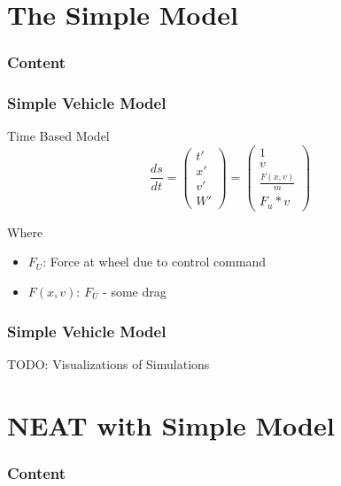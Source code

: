 \documentclass[8pt]{beamer}
\begin{document}
\section{The Simple Model}
\begin{frame}
	\frametitle{Content}
\end{frame}
\begin{frame}
	\frametitle{Simple Vehicle Model}
	\begin{block}{Time Based Model}	
	\[
	\frac{ds}{dt} = \left(
			\begin{array}{ll}
			t' \\
			x' \\
			v' \\
			W'
			\end{array}
		\right)
		= \left(
			\begin{array}{ll}
			1 \\
			v \\
			\frac{F(x,v)}{m} \\
			F_u * v
			\end{array}
		\right)
	\]
	
	Where\\
	\begin{itemize}
		\item $F_U$: Force at wheel due to control command
		\item $F(x,v)$: $F_U$ - some drag
	\end{itemize}
	\end{block}

\end{frame}

\begin{frame}
	\frametitle{Simple Vehicle Model}
	TODO: Visualizations of Simulations
\end{frame}


\section{NEAT with Simple Model}
\begin{frame}
	\frametitle{Content}
\end{frame}
\end{document}
